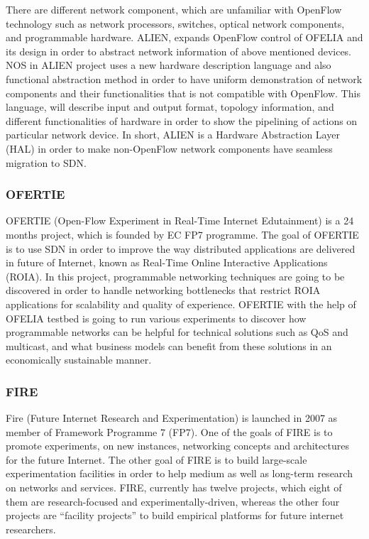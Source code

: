 There are different network component, which are unfamiliar with OpenFlow technology such as network processors, switches, optical network components, and programmable hardware. ALIEN, expands OpenFlow control of OFELIA and its design in order to abstract network information of above mentioned devices. NOS in ALIEN project uses a new hardware description language and also functional abstraction method in order to have uniform demonstration of network components and their functionalities that is not compatible with OpenFlow. This language, will describe input and output format, topology information, and different functionalities of hardware in order to show the pipelining of actions on particular network device. In short, ALIEN is a Hardware Abstraction Layer (HAL) in order to make non-OpenFlow network components have seamless migration to SDN.    

\subsubsection{OFERTIE}

OFERTIE (Open-Flow Experiment in Real-Time Internet Edutainment) is a 24 months project, which is founded by EC FP7 programme. The goal of OFERTIE is to use SDN in order to improve the way distributed applications are delivered in future of Internet, known as Real-Time Online Interactive Applications (ROIA). In this project, programmable networking techniques are going to be discovered in order to handle networking bottlenecks that restrict ROIA applications for scalability and quality of experience. OFERTIE with the help of OFELIA testbed is going to run various experiments to discover how programmable networks can be helpful for technical solutions such as QoS and multicast, and what business models can benefit from these solutions in an economically sustainable manner. \cite{OFERTIEproject} 

\subsubsection{FIRE}

Fire (Future Internet Research and Experimentation) is launched in 2007 as member of Framework Programme 7 (FP7). One of the goals of FIRE is to promote experiments, on new instances, networking concepts and architectures for the future Internet. The other goal of FIRE is to build large-scale experimentation facilities in order to help medium as well as long-term research on networks and services. FIRE, currently has twelve projects, which eight of them are research-focused and experimentally-driven, whereas the other four projects are “facility projects” to build empirical platforms for future internet researchers. \cite{FIREproject}  

\clearpage
